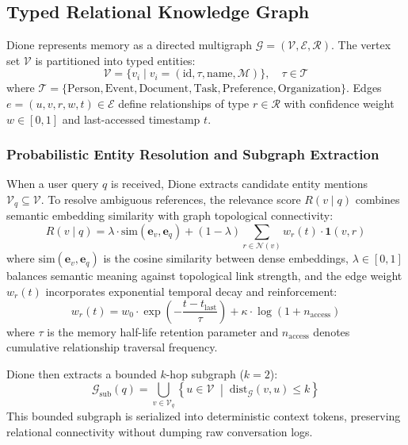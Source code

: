 \documentclass[conference,a4paper]{IEEEtran}
\begin{document}
\subsection{Typed Relational Knowledge Graph}
Dione represents memory as a directed multigraph $\mathcal{G} = (\mathcal{V}, \mathcal{E}, \mathcal{R})$. The vertex set $\mathcal{V}$ is partitioned into typed entities:
\begin{equation}
\mathcal{V} = \{v_i \mid v_i = (\text{id}, \tau, \text{name}, \mathcal{M})\}, \quad \tau \in \mathcal{T}
\end{equation}
where $\mathcal{T} = \{\text{Person}, \text{Event}, \text{Document}, \text{Task}, \text{Preference}, \text{Organization}\}$. Edges $e = (u, v, r, w, t) \in \mathcal{E}$ define relationships of type $r \in \mathcal{R}$ with confidence weight $w \in [0, 1]$ and last-accessed timestamp $t$.

\subsubsection{Probabilistic Entity Resolution and Subgraph Extraction}
When a user query $q$ is received, Dione extracts candidate entity mentions $\mathcal{V}_q \subseteq \mathcal{V}$. To resolve ambiguous references, the relevance score $R(v \mid q)$ combines semantic embedding similarity with graph topological connectivity:
\begin{equation}
R(v \mid q) = \lambda \cdot \text{sim}(\mathbf{e}_v, \mathbf{e}_q) + (1 - \lambda) \sum_{r \in \mathcal{N}(v)} w_r(t) \cdot \mathbf{1}(v, r)
\end{equation}
where $\text{sim}(\mathbf{e}_v, \mathbf{e}_q)$ is the cosine similarity between dense embeddings, $\lambda \in [0, 1]$ balances semantic meaning against topological link strength, and the edge weight $w_r(t)$ incorporates exponential temporal decay and reinforcement:
\begin{equation}
w_r(t) = w_0 \cdot \exp\left(-\frac{t - t_{\text{last}}}{\tau}\right) + \kappa \cdot \log(1 + n_{\text{access}})
\end{equation}
where $\tau$ is the memory half-life retention parameter and $n_{\text{access}}$ denotes cumulative relationship traversal frequency.

Dione then extracts a bounded $k$-hop subgraph ($k=2$):
\begin{equation}
\mathcal{G}_{\text{sub}}(q) = \bigcup_{v \in \mathcal{V}_q} \left\{ u \in \mathcal{V} \;\middle|\; \text{dist}_{\mathcal{G}}(v, u) \le k \right\}
\end{equation}
This bounded subgraph is serialized into deterministic context tokens, preserving relational connectivity without dumping raw conversation logs.
\end{document}
